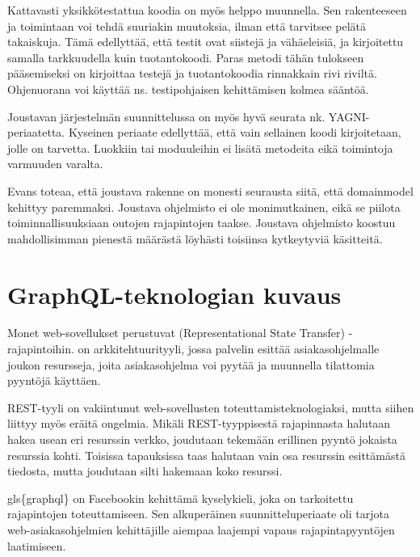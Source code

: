 Kattavasti yksikkötestattua koodia on myös helppo muunnella. Sen
rakenteeseen ja toimintaan voi tehdä suuriakin muutoksia, ilman että
tarvitsee pelätä takaiskuja. Tämä edellyttää, että testit ovat siistejä
ja vähäeleisiä, ja kirjoitettu samalla tarkkuudella kuin tuotantokoodi.
Paras metodi tähän tulokseen pääsemiseksi on kirjoittaa testejä ja
tuotantokoodia rinnakkain rivi riviltä. Ohjenuorana voi käyttää ns.
testipohjaisen kehittämisen kolmea
sääntöä.\cite[luku 9]{martin2008clean}

Joustavan järjestelmän suunnittelussa on myös hyvä seurata nk.
YAGNI-periaatetta. Kyseinen periaate edellyttää, että vain sellainen
koodi kirjoitetaan, jolle on tarvetta. Luokkiin tai moduuleihin ei
lisätä metodeita eikä toimintoja varmuuden varalta. \cite{jeffries1998}

Evans toteaa, että joustava rakenne on monesti seurausta siitä, että
\gls{domainmodel} kehittyy paremmaksi. Joustava ohjelmisto ei ole
monimutkainen, eikä se piilota toiminnallisuuksiaan outojen rajapintojen
taakse. Joustava ohjelmisto koostuu mahdollisimman pienestä määrästä
löyhästi toisiinsa kytkeytyviä käsitteitä.\cite[luku 10]{evans:ddd}

\hypertarget{graphql-teknologian-kuvaus}{%
\section{GraphQL-teknologian kuvaus}\label{graphql-teknologian-kuvaus}}

Monet web-sovellukset perustuvat  (Representational
State Transfer) -rajapintoihin.  on
arkkitehtuurityyli, jossa palvelin esittää asiakasohjelmalle joukon
resursseja, joita asiakasohjelma voi pyytää ja muunnella tilattomia
pyyntöjä käyttäen.\cite{fielding2000architectural}

REST-tyyli on vakiintunut web-sovellusten toteuttamisteknologiaksi,
mutta siihen liittyy myös eräitä ongelmia. Mikäli REST-tyyppisestä
rajapinnasta halutaan hakea usean eri resurssin verkko, joudutaan
tekemään erillinen pyyntö jokaista resurssia kohti. Toisissa tapauksissa
taas halutaan vain osa resurssin esittämästä tiedosta, mutta joudutaan
silti hakemaan koko
resurssi.\cite{betterRESTPrisma}\cite{WhyUseGraphQLApollo}

gls\{graphql\} on Facebookin kehittämä kyselykieli, joka on tarkoitettu
rajapintojen toteuttamiseen. Sen alkuperäinen suunnitteluperiaate oli
tarjota web-asiakasohjelmien kehittäjille aiempaa laajempi vapaus
rajapintapyyntöjen laatimiseen. \cite{graphql:spec}

